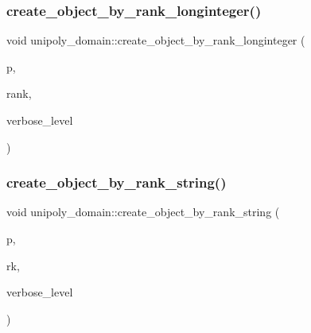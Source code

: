 \subsubsection{\texorpdfstring{create\+\_\+object\+\_\+by\+\_\+rank\+\_\+longinteger()}{create\_object\_by\_rank\_longinteger()}}
{\footnotesize\ttfamily void unipoly\+\_\+domain\+::create\+\_\+object\+\_\+by\+\_\+rank\+\_\+longinteger (\begin{DoxyParamCaption}\item[{\mbox{\hyperlink{galois_8h_a77ca58de3d2da6172242493dd9c8aaa8}{unipoly\+\_\+object}} \&}]{p,  }\item[{\mbox{\hyperlink{classlonginteger__object}{longinteger\+\_\+object}} \&}]{rank,  }\item[{\mbox{\hyperlink{galois_8h_a09fddde158a3a20bd2dcadb609de11dc}{I\+NT}}}]{verbose\+\_\+level }\end{DoxyParamCaption})}

\mbox{\label{classunipoly__domain_ae3243756144f89d8a0fbd48f9e1d7840}} 
\subsubsection{\texorpdfstring{create\+\_\+object\+\_\+by\+\_\+rank\+\_\+string()}{create\_object\_by\_rank\_string()}}
{\footnotesize\ttfamily void unipoly\+\_\+domain\+::create\+\_\+object\+\_\+by\+\_\+rank\+\_\+string (\begin{DoxyParamCaption}\item[{\mbox{\hyperlink{galois_8h_a77ca58de3d2da6172242493dd9c8aaa8}{unipoly\+\_\+object}} \&}]{p,  }\item[{const \mbox{\hyperlink{galois_8h_ab6cc7b4aeb6ea31aba2b3fbfc83ff5e6}{B\+Y\+TE}} $\ast$}]{rk,  }\item[{\mbox{\hyperlink{galois_8h_a09fddde158a3a20bd2dcadb609de11dc}{I\+NT}}}]{verbose\+\_\+level }\end{DoxyParamCaption})}

\mbox{\label{classunipoly__domain_a129f1730bd8a7268028d6a16fb15c5dc}} 

